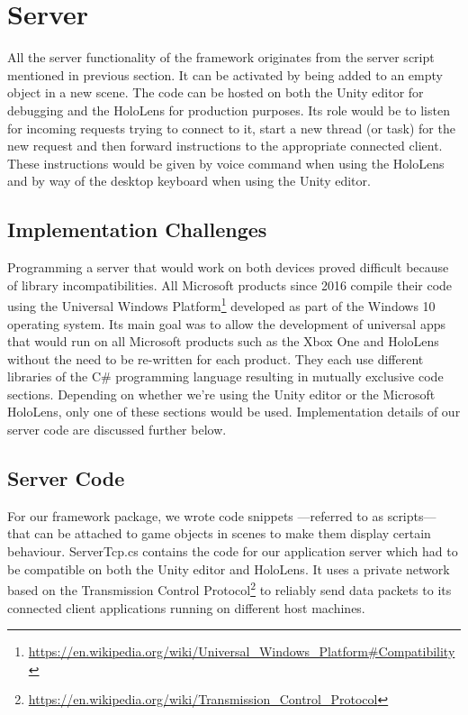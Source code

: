 \section{Server}
All the server functionality of the framework originates from the server script mentioned in previous section. It can be activated by being added to an empty object in a new scene. The code can be hosted on both the Unity editor for debugging and the HoloLens for production purposes. Its role would be to listen for incoming requests trying to connect to it, start a new thread (or task) for the new request and then forward instructions to the appropriate connected client. These instructions would be given by voice command when using the HoloLens and by way of the desktop keyboard when using the Unity editor.

\subsection{Implementation Challenges}
Programming a server that would work on both devices proved difficult because of library incompatibilities. All Microsoft products since 2016 compile their code using the Universal Windows Platform\footnote{\protect\url{https://en.wikipedia.org/wiki/Universal\_Windows\_Platform\#Compatibility}} developed as part of the Windows 10 operating system. Its main goal was to allow the development of universal apps that would run on all Microsoft products such as the Xbox One and HoloLens without the need to be re-written for each product. They each use different libraries of the C\# programming language resulting in mutually exclusive code sections. Depending on whether we're using the Unity editor or the Microsoft HoloLens, only one of these sections would be used. Implementation details of our server code are discussed further below.

\subsection{Server Code}
For our framework package, we wrote code snippets ---referred to as scripts--- that can be attached to game objects in scenes to make them display certain behaviour. ServerTcp.cs contains the code for our application server which had to be compatible on both the Unity editor and HoloLens. It uses a private network based on the Transmission Control Protocol\footnote{\protect\url{https://en.wikipedia.org/wiki/Transmission\_Control\_Protocol}} to reliably send data packets to its connected client applications running on different host machines.

